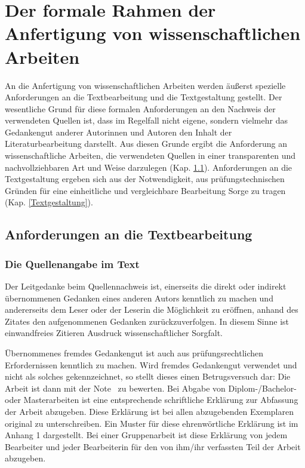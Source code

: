 \documentclass[a4paper, 12pt]{article}
\begin{document}
\section{Der formale Rahmen der Anfertigung von wissenschaftlichen
Arbeiten}\label{Formales}

An die Anfertigung von wissenschaftlichen Arbeiten werden \"{a}u\ss erst spezielle
Anforderungen an die Textbearbeitung und die Textgestaltung gestellt. Der
wesentliche Grund f\"{u}r diese formalen Anforderungen an den Nachweis der verwendeten
Quellen ist, dass im Regelfall nicht eigene, sondern vielmehr das Gedankengut
anderer Autorinnen und Autoren den Inhalt der Literaturbearbeitung darstellt. Aus
diesen Grunde ergibt die Anforderung an wissenschaftliche Arbeiten, die verwendeten
Quellen in einer transparenten und nachvollziehbaren Art und Weise darzulegen (Kap.
\ref{Textbearbeitung}). Anforderungen an die Textgestaltung ergeben sich aus der
Notwendigkeit, aus pr\"{u}fungstechnischen Gr\"{u}nden f\"{u}r eine einheitliche und
vergleichbare Bearbeitung Sorge zu tragen (Kap. \ref{Textgestaltung}).

\subsection{Anforderungen an die Textbearbeitung} \label{Textbearbeitung}

\subsubsection{Die Quellenangabe im Text}

Der Leitgedanke beim Quellennachweis ist, einerseits die direkt oder indirekt
\"{u}bernommenen Gedanken eines anderen Autors kenntlich zu machen und andererseits dem
Leser oder der Leserin die M\"{o}glichkeit zu er\"{o}ffnen, anhand des Zitates den
aufgenommenen Gedanken zur\"{u}ckzuverfolgen. In diesem Sinne ist einwandfreies Zitieren
Ausdruck wissenschaftlicher Sorgfalt.

\"{U}bernommenes fremdes Gedankengut ist auch aus pr\"{u}fungsrechtlichen Erfordernissen
kenntlich zu machen. Wird fremdes Gedankengut verwendet und nicht als solches
gekennzeichnet, so stellt dieses einen Betrugsversuch dar: Die Arbeit ist dann mit
der Note \grqq\ zu bewerten. Bei Abgabe von Diplom-/Bachelor- oder
Masterarbeiten ist eine entsprechende schriftliche Erkl\"{a}rung zur Abfassung der
Arbeit abzugeben. Diese Erkl\"{a}rung ist bei allen abzugebenden Exemplaren original zu
unterschreiben. Ein Muster f\"{u}r diese ehrenw\"{o}rtliche Erkl\"{a}rung ist im Anhang 1
dargestellt. Bei einer Gruppenarbeit ist diese Erkl\"{a}rung von jedem Bearbeiter und
jeder Bearbeiterin f\"{u}r den von ihm/ihr verfassten Teil der Arbeit abzugeben.
\end{document}
